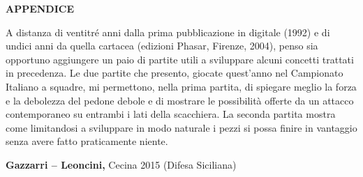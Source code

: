 \textbf{APPENDICE}

A distanza di ventitré anni dalla prima pubblicazione in digitale (1992)
e di undici anni da quella cartacea (edizioni Phasar, Firenze, 2004),
penso sia opportuno aggiungere un paio di partite utili a sviluppare
alcuni concetti trattati in precedenza. Le due partite che presento,
giocate quest'anno nel Campionato Italiano a squadre, mi permettono,
nella prima partita, di spiegare meglio la forza e la debolezza del
pedone debole e di mostrare le possibilità offerte da un attacco
contemporaneo su entrambi i lati della scacchiera. La seconda partita
mostra come limitandosi a sviluppare in modo naturale i pezzi si possa
finire in vantaggio senza avere fatto praticamente niente.

\textbf{Gazzarri -- Leoncini,} Cecina 2015 (Difesa Siciliana)

